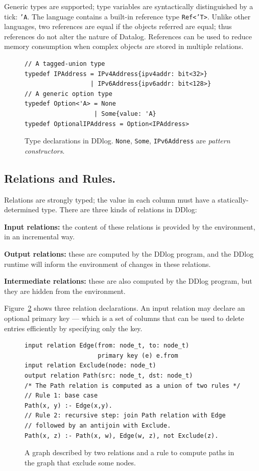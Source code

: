 Generic types are supported; type variables are syntactically
distinguished by a tick: \texttt{'A}.  The language
contains a built-in reference type \texttt{Ref<'T>}.  Unlike other
languages, two references are equal if the objects referred are equal;
thus references do not alter the nature of Datalog.  References can be
used to reduce memory consumption when complex objects are stored in
multiple relations.

\begin{figure}[t]
  \footnotesize
\begin{lstlisting}[language=ddlog]
// A tagged-union type
typedef IPAddress = IPv4Address{ipv4addr: bit<32>}
                  | IPv6Address{ipv6addr: bit<128>}
// A generic option type
typedef Option<'A> = None
                   | Some{value: 'A}
typedef OptionalIPAddress = Option<IPAddress>
\end{lstlisting}
\caption{Type declarations in DDlog.  \texttt{None}, \texttt{Some},
\texttt{IPv6Address} are \emph{pattern constructors}.\label{fig:types}}
\end{figure}

\subsection{Relations and Rules.}

Relations are strongly typed; the value in each column must have a
statically-determined type.  There are three kinds of relations in
DDlog:

\noindent \textbf{Input relations:} the content of these relations is provided by
the environment, in an incremental way.

\noindent \textbf{Output relations:} these are computed by the DDlog
program, and the DDlog runtime will inform the environment of changes
in these relations.

\noindent \textbf{Intermediate relations:} these are also computed by
the DDlog program, but they are hidden from the environment.

Figure~\ref{fig:relations-rules} shows three relation declarations.
An input relation may declare an optional primary key --- which is a
set of columns that can be used to delete entries efficiently by
specifying only the key.

\begin{figure}[t]
  \small
  \begin{lstlisting}[language=ddlog]
input relation Edge(from: node_t, to: node_t)
                    primary key (e) e.from
input relation Exclude(node: node_t)
output relation Path(src: node_t, dst: node_t)
/* The Path relation is computed as a union of two rules */
// Rule 1: base case
Path(x, y) :- Edge(x,y).
// Rule 2: recursive step: join Path relation with Edge
// followed by an antijoin with Exclude.
Path(x, z) :- Path(x, w), Edge(w, z), not Exclude(z).
  \end{lstlisting}
  \caption{A graph described by two relations and a rule to compute
    paths in the graph that exclude some nodes.\label{fig:relations-rules}}
\end{figure}

